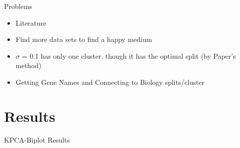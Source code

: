 \documentclass[serif]{beamer}
\begin{document}
	\begin{frame}
		{\huge Problems}
		\begin{itemize}
			\item Literature
			\item  Find more data sets to find a happy medium
			\item  $\sigma$ = 0.1 has only one cluster, though it has the optimal split (by Paper's method)
			\item  Getting Gene Names and Connecting to Biology splits/cluster
		\end{itemize}
	\end{frame}
	
	\section{Results}
	
	\begin{frame}
		\begin{center}
			{\huge KPCA-Biplot Results}
		\end{center}
	\end{frame}
	
\end{document}

